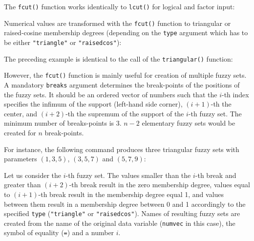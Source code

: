 \documentclass[review]{elsarticle}
\newcommand{\code}[1]{\texttt{#1}}
\begin{document}
The \code{fcut()} function works identically to \code{lcut()} for logical and factor input:
%

%
Numerical values are transformed with the \code{fcut()} function to triangular or raised-cosine membership degrees (depending on the \code{type} argument which has to be either \code{"triangle"} or \code{"raisedcos"}):
%

%
The preceding example is identical to the call of the \code{triangular()} function:
%

%

However, the \code{fcut()} function is mainly useful for creation of multiple fuzzy sets. A mandatory \code{breaks} argument determines the break-points of the positions of the fuzzy sets. It should be an ordered vector of numbers such that the $i$-th index specifies the infimum of the support (left-hand side corner), $(i+1)$-th the center, and $(i+2)$-th the supremum of the support of the $i$-th fuzzy set. The minimum number of breaks-points is 3. $n-2$ elementary fuzzy sets would be created for $n$ break-points.

For instance, the following command produces three triangular fuzzy sets with parameters $(1, 3, 5)$, $(3, 5, 7)$ and $(5, 7, 9)$:
%

%

Let us consider the $i$-th fuzzy set. The values smaller than the $i$-th break and greater than $(i+2)$-th break result in the zero membership degree, values equal to $(i+1)$-th break result in the membership degree equal 1, and values between them result in a membership degree between 0 and 1 accordingly to the specified \code{type} (\code{"triangle"} or \code{"raisedcos"}).
Names of resulting fuzzy sets are created from the name of the original data variable (\code{numvec} in this case), the symbol of equality (\code{=}) and a number $i$.
\end{document}
